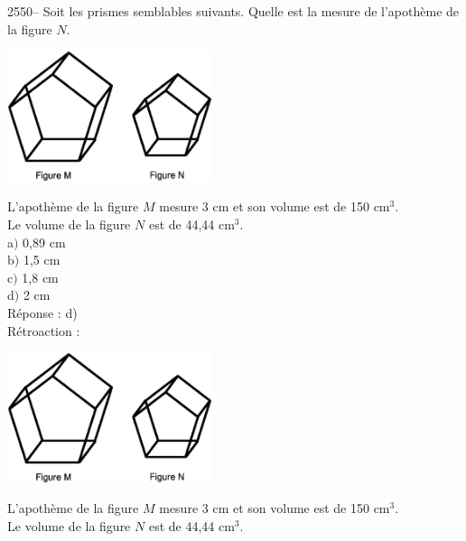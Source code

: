 \documentclass[letterpaper, 12pt]{article}
\begin{document}
2550-- Soit les prismes semblables suivants. Quelle est la mesure de l'apoth\`eme de la figure $N$.\\
\begin{center}
 \includegraphics[width=6cm,bb=14 14 588 376]{Q2550.eps}
\end{center}
L'apoth\`eme de la figure $M$ mesure 3 cm et son volume est de 150 cm$^{3}$.\\
Le volume de la figure $N$ est de 44,44 cm$^{3}$.\\

a$)$  0,89 cm \\
b$)$  1,5 cm \\
c$)$  1,8 cm \\
d$)$  2 cm\\

R\'eponse : d)\\

R\'etroaction :\\
\begin{center}
 \includegraphics[width=6cm,bb=14 14 588 376]{Q2550.eps}
\end{center}
L'apoth\`eme de la figure $M$ mesure 3 cm et son volume est de 150 cm$^{3}$.\\
Le volume de la figure $N$ est de 44,44 cm$^{3}$.\\
\end{document}
